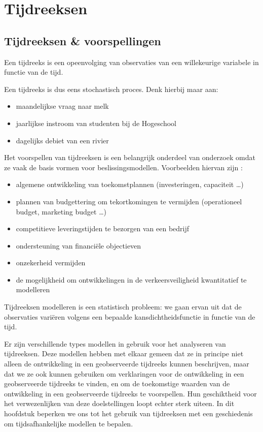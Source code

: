 \chapter{Tijdreeksen}

\section{Tijdreeksen \& voorspellingen}

\begin{definition}[Tijdsreeks]
	Een tijdreeks is een opeenvolging van observaties van een willekeurige variabele in functie van de tijd.
\end{definition}

Een tijdreeks is dus eens stochastisch proces. Denk hierbij maar aan:
\begin{itemize}
	\item maandelijkse vraag naar melk
	\item jaarlijkse instroom van studenten bij de Hogeschool
	\item dagelijks debiet van een rivier
\end{itemize}

Het voorspellen van tijdreeksen is een belangrijk onderdeel van onderzoek omdat ze vaak de basis vormen voor beslissingsmodellen. Voorbeelden hiervan zijn :

\begin{itemize}
	\item algemene ontwikkeling van toekomstplannen (investeringen, capaciteit \dots)
	\item plannen van budgettering om tekortkomingen te vermijden (operationeel budget, marketing budget \dots)
	\item competitieve leveringstijden te bezorgen van een bedrijf
	\item ondersteuning van financi\"ele objectieven
	\item onzekerheid vermijden
	\item de mogelijkheid om ontwikkelingen in de verkeersveiligheid
kwantitatief te modelleren
\end{itemize}

Tijdreeksen modelleren is een statistisch probleem: we gaan ervan uit dat de observaties vari\"eren volgens een bepaalde kansdichtheidsfunctie in functie van de tijd. 

Er zijn verschillende types modellen in gebruik voor het analyseren van tijdreeksen. Deze modellen hebben met elkaar gemeen dat ze in principe niet alleen de ontwikkeling in een geobserveerde tijdreeks kunnen beschrijven, maar dat we ze ook kunnen gebruiken om verklaringen voor de ontwikkeling in een geobserveerde tijdreeks te vinden, en om de toekomstige waarden van de
ontwikkeling in een geobserveerde tijdreeks te voorspellen. Hun geschiktheid voor het verwezenlijken van deze doelstellingen loopt echter sterk uiteen. In dit hoofdstuk beperken we ons tot het gebruik van tijdreeksen met een geschiedenis om tijdsafhankelijke modellen te bepalen. 

